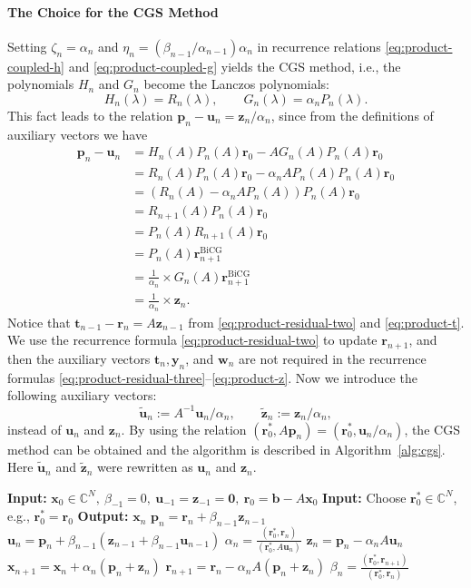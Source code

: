 \paragraph{{The Choice for the CGS Method}}\label{subsec:cgs-parameter-choice}\mbox{}\par
{Setting $\zeta_n=\alpha_n$ and $\eta_n=(\beta_{n-1}/\alpha_{n-1})\alpha_n$ in recurrence relations \eqref{eq:product-coupled-h} and \eqref{eq:product-coupled-g} yields the CGS method, i.e., the polynomials $H_n$ and $G_n$ become the Lanczos polynomials:}
\[H_n(\lambda)=R_n(\lambda),\qquad G_n(\lambda)=\alpha_nP_n(\lambda).\]
{This fact leads to the relation $\bm p_n-\bm u_n=\bm z_n/\alpha_n$, since from the definitions of auxiliary vectors we have}
\[\begin{aligned}\bm p_n-\bm u_n&=H_n(A)P_n(A)\bm r_0-AG_n(A)P_n(A)\bm r_0\\&=R_n(A)P_n(A)\bm r_0-\alpha_nAP_n(A)P_n(A)\bm r_0\\&=(R_n(A)-\alpha_nAP_n(A))P_n(A)\bm r_0\\&=R_{n+1}(A)P_n(A)\bm r_0\\&=P_n(A)R_{n+1}(A)\bm r_0\\&=P_n(A)\bm r_{n+1}^{\mathrm{BiCG}}\\&=\frac1{\alpha_n}\times G_n(A)\bm r_{n+1}^{\mathrm{BiCG}}\\&=\frac1{\alpha_n}\times\bm z_n.\end{aligned}\]
{Notice that $\bm t_{n-1}-\bm r_n=A\bm z_{n-1}$ from \eqref{eq:product-residual-two} and \eqref{eq:product-t}. We use the recurrence formula \eqref{eq:product-residual-two} to update $\bm r_{n+1}$, and then the auxiliary vectors $\bm t_n,\bm y_n$, and $\bm w_n$ are not required in the recurrence formulas \eqref{eq:product-residual-three}--\eqref{eq:product-z}. Now we introduce the following auxiliary vectors:}
\[\widetilde{\bm u}_n:=A^{-1}\bm u_n/\alpha_n,\qquad\widetilde{\bm z}_n:=\bm z_n/\alpha_n,\]
{instead of $\bm u_n$ and $\bm z_n$. By using the relation $(\bm r_0^{*},A\bm p_n)=(\bm r_0^{*},\bm u_n/\alpha_n)$, the CGS method can be obtained and the algorithm is described in Algorithm\ \ref{alg:cgs}. Here $\widetilde{\bm u}_n$ and $\widetilde{\bm z}_n$ were rewritten as $\bm u_n$ and $\bm z_n$.}
\begin{algorithm}[H]\caption{{The CGS method}}\label{alg:cgs}\begin{algorithmic}[1]
\Statex\textbf{Input:} $\bm x_0\in\mathbb C^N,\ \beta_{-1}=0,\ \bm u_{-1}=\bm z_{-1}=\bm0,\ \bm r_0=\bm b-A\bm x_0$
\Statex\textbf{Input:} {Choose $\bm r_0^{*}\in\mathbb C^N$, e.g., $\bm r_0^{*}=\bm r_0$}
\Statex\textbf{Output:} $\bm x_n$
\State $\bm p_n=\bm r_n+\beta_{n-1}\bm z_{n-1}$
\State $\bm u_n=\bm p_n+\beta_{n-1}(\bm z_{n-1}+\beta_{n-1}\bm u_{n-1})$
\State $\alpha_n=\frac{(\bm r_0^{*},\bm r_n)}{(\bm r_0^{*},A\bm u_n)}$
\State $\bm z_n=\bm p_n-\alpha_nA\bm u_n$
\State $\bm x_{n+1}=\bm x_n+\alpha_n(\bm p_n+\bm z_n)$
\State $\bm r_{n+1}=\bm r_n-\alpha_nA(\bm p_n+\bm z_n)$
\State $\beta_n=\frac{(\bm r_0^{*},\bm r_{n+1})}{(\bm r_0^{*},\bm r_n)}$
\EndFor\end{algorithmic}\end{algorithm}
